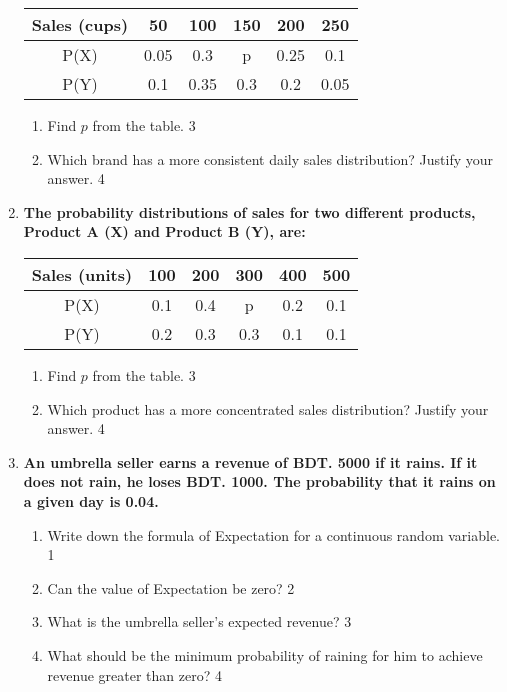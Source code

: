 \documentclass[a4paper,oneside, margin=1.4in]{book}
\begin{document}
\begin{enumerate}
	    \begin{table}[h]
	    	  \begin{center}
\begin{tabular}{c|c|c|c|c|c}
Sales (cups) & 50   & 100  & 150  & 200  & 250  \\ \hline
P(X)         & 0.05 & 0.3  & p    & 0.25 & 0.1  \\ \hline
P(Y)         & 0.1  & 0.35 & 0.3  & 0.2  & 0.05
\end{tabular}
	  \end{center}
\end{table}
  
  \begin{enumerate}
       \item  
	Find \( p \) from the table. \hfill 3
    \item
	Which brand has a more consistent daily sales distribution? Justify your answer. \hfill 4
  \end{enumerate}
  

\item
\textbf{The probability distributions of sales for two different products, Product A (X) and Product B (Y), are:} 

\begin{table}[H]
\begin{center}
\begin{tabular}{c|c|c|c|c|c}
Sales (units) & 100  & 200  & 300  & 400  & 500  \\ \hline
P(X)          & 0.1  & 0.4  & p    & 0.2  & 0.1  \\ \hline
P(Y)          & 0.2  & 0.3  & 0.3  & 0.1  & 0.1
\end{tabular}
\end{center}
\end{table}

\begin{enumerate}
    \item
    Find \( p \) from the table. \hfill 3

    \item
    Which product has a more concentrated sales distribution? Justify your answer. \hfill 4
\end{enumerate}

\item
	  \textbf{An umbrella seller earns a revenue of BDT. 5000 if it rains. If it does not rain, he loses BDT. 1000. The probability that it rains on a given day is 0.04.} 
  
  \begin{enumerate}
    \item
	Write down the formula of Expectation for a continuous random variable. \hfill 1
    \item
	Can the value of Expectation be zero? \hfill 2
    \item  
	What is the umbrella seller's expected revenue? \hfill 3
    \item
	What should be the minimum probability of raining for him to achieve revenue greater than zero? \hfill 4
  \end{enumerate}
  

\end{enumerate}
\end{document}
